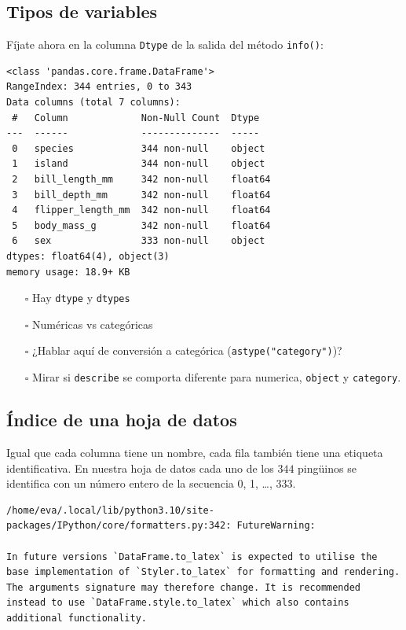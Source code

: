 \documentclass[
  a4paper,
  noprof,
  12pt,
  notoc,
  nosols,
  nobib]{mnye}
\providecommand{\tightlist}{%
  \setlength{\itemsep}{0pt}\setlength{\parskip}{0pt}}\usepackage{longtable,booktabs,array}
\theoremstyle{definition}
\theoremstyle{remark}
\begin{document}
\hypertarget{tipos-de-variables}{%
\subsection{Tipos de variables}\label{tipos-de-variables}}

Fíjate ahora en la columna \texttt{Dtype} de la salida del método
\texttt{info()}:

\begin{verbatim}
<class 'pandas.core.frame.DataFrame'>
RangeIndex: 344 entries, 0 to 343
Data columns (total 7 columns):
 #   Column             Non-Null Count  Dtype  
---  ------             --------------  -----  
 0   species            344 non-null    object 
 1   island             344 non-null    object 
 2   bill_length_mm     342 non-null    float64
 3   bill_depth_mm      342 non-null    float64
 4   flipper_length_mm  342 non-null    float64
 5   body_mass_g        342 non-null    float64
 6   sex                333 non-null    object 
dtypes: float64(4), object(3)
memory usage: 18.9+ KB
\end{verbatim}

\begin{itemize}
\tightlist
\item[$\square$]
  Hay \texttt{dtype} y \texttt{dtypes}
\item[$\square$]
  Numéricas vs categóricas
\item[$\square$]
  ¿Hablar aquí de conversión a categórica (\texttt{astype("category")})?
\item[$\square$]
  Mirar si \texttt{describe} se comporta diferente para numerica,
  \texttt{object} y \texttt{category}.
\end{itemize}

\hypertarget{uxedndice-de-una-hoja-de-datos}{%
\subsection{Índice de una hoja de
datos}\label{uxedndice-de-una-hoja-de-datos}}

Igual que cada columna tiene un nombre, cada fila también tiene una
etiqueta identificativa. En nuestra hoja de datos cada uno de los
\(344\) pingüinos se identifica con un número entero de la secuencia 0,
1, \ldots, 333.

\begin{verbatim}
/home/eva/.local/lib/python3.10/site-packages/IPython/core/formatters.py:342: FutureWarning:

In future versions `DataFrame.to_latex` is expected to utilise the base implementation of `Styler.to_latex` for formatting and rendering. The arguments signature may therefore change. It is recommended instead to use `DataFrame.style.to_latex` which also contains additional functionality.
\end{verbatim}
\end{document}
